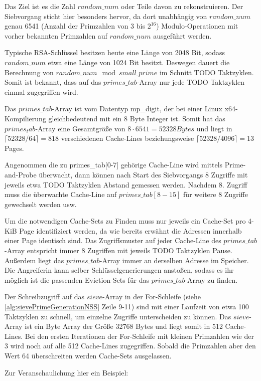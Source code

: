 Das Ziel ist es die Zahl $random\_num$ oder Teile davon zu rekonstruieren.
Der Siebvorgang sticht hier besonders hervor, da dort unabhängig von $random\_num$ genau 6541 (Anzahl der Primzahlen von 3 bis $2^{16}$) Modulo-Operationen mit vorher bekannten Primzahlen auf $random\_num$ ausgeführt werden.

Typische RSA-Schlüssel besitzen heute eine Länge von 2048 Bit, sodass $random\_num$ etwa eine Länge von 1024 Bit besitzt.
Deswegen dauert die Berechnung von $random\_num \mod small\_prime$ im Schnitt TODO Taktzyklen.
Somit ist bekannt, dass auf das $primes\_tab$-Array nur jede TODO Taktzyklen einmal zugegriffen wird.

Das $primes\_tab$-Array ist vom Datentyp mp_digit, der bei einer Linux x64-Kompilierung gleichbedeutend mit ein 8 Byte Integer ist.
Somit hat das $primes_tab$-Array eine Gesamtgröße von $8 \cdot 6541 = 52328 Bytes$ und liegt in $\lceil 52328 / 64 \rceil = 818$ verschiedenen Cache-Lines beziehungsweise $\lceil 52328 / 4096 \rceil = 13$ Pages.

Angenommen die zu primes_tab[0-7] gehörige Cache-Line wird mittels Prime-and-Probe überwacht, dann können nach Start des Siebvorgangs 8 Zugriffe mit jeweils etwa TODO Taktzyklen Abstand gemessen werden.
Nachdem 8. Zugriff muss die überwachte Cache-Line auf $primes\_tab[8-15]$ für weitere 8 Zugriffe gewechselt werden usw.

Um die notwendigen Cache-Sets zu Finden muss nur jeweils ein Cache-Set pro 4-KiB Page identifiziert werden, da wie bereits erwähnt die Adressen innerhalb einer Page identisch sind.
Das Zugriffsmuster auf jeder Cache-Line des $primes\_tab$-Array entspricht immer 8 Zugriffen mit jeweils TODO Taktzyklen Pause. Außerdem liegt das $primes\_tab$-Array immer an derselben Adresse im Speicher.
Die Angreiferin kann selber Schlüsselgenerierungen anstoßen, sodass es ihr möglich ist die passenden Eviction-Sets für das $primes\_tab$-Array zu finden.

Der Schreibzugriff auf das $sieve$-Array in der For-Schleife (siehe \ref{alg:sievePrimeGenerationNSS} Zeile 9-11) sind mit einer Laufzeit von etwa 100 Taktzyklen zu schnell, um einzelne Zugriffe unterscheiden zu können.
Das $sieve$-Array ist ein Byte Array der Größe 32768 Bytes und liegt somit in 512 Cache-Lines.
Bei den ersten Iterationen der For-Schleife mit kleinen Primzahlen wie der 3 wird noch auf alle 512 Cache-Lines zugegriffen.
Sobald die Primzahlen aber den Wert 64 überschreiten werden Cache-Sets ausgelassen.

Zur Veranschaulichung hier ein Beispiel:

